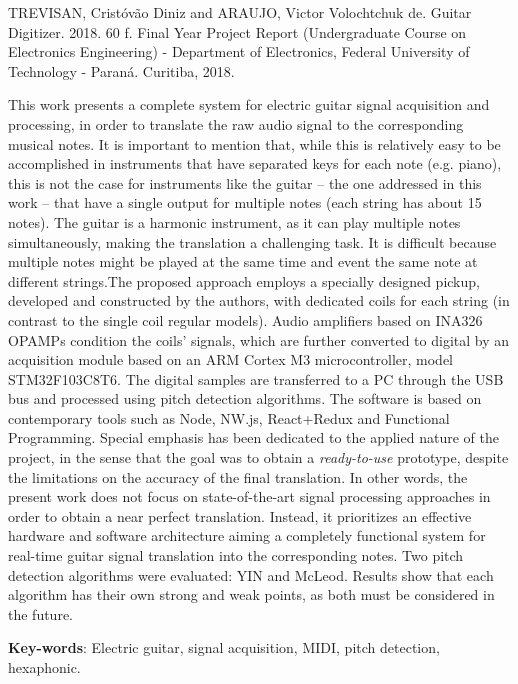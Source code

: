 \setlength{\absparsep}{18pt} %

\begin{summary}[Abstract]
	TREVISAN, Cristóvão Diniz and ARAUJO, Victor Volochtchuk de.
	Guitar Digitizer. 2018. 60 f. Final Year Project Report
	(Undergraduate Course on Electronics Engineering) - Department of Electronics,
	Federal University of Technology - Paraná. Curitiba, 2018.


	This work presents a complete system for electric guitar signal acquisition and processing, in order to translate
	the raw audio signal to the corresponding musical notes. It is important to mention that, while this is
	relatively easy to be accomplished in instruments that have separated keys for each note (e.g. piano),
	this is not the case for instruments like the guitar – the one addressed in this work – that have a single
	output for multiple notes (each string has about 15 notes). The guitar is a harmonic instrument, as it can
	play multiple notes simultaneously, making the translation a challenging task. It is difficult because
	multiple notes might be played at the same time and event the same note at different strings.The proposed
	approach employs a specially designed pickup, developed and constructed by the authors, with dedicated coils for
	each string (in contrast to the single coil regular models). Audio amplifiers based on INA326 OPAMPs
	condition the coils’ signals, which are further converted to digital by an acquisition module based on an
	ARM Cortex M3 microcontroller, model STM32F103C8T6. The digital samples are transferred to a PC
	through the USB bus and processed using pitch detection algorithms. The software is based on
	contemporary tools such as Node, NW.js, React+Redux and Functional Programming. Special emphasis
	has been dedicated to the applied nature of the project, in the sense that the goal was to obtain a
	\emph{ready-to-use} prototype, despite the limitations on the accuracy of the final translation. In other
	words, the present work does not focus on state-of-the-art signal processing approaches in order to
	obtain a near perfect translation. Instead, it prioritizes an effective hardware and software architecture
	aiming a completely functional system for real-time guitar signal translation into the corresponding
	notes. Two pitch detection algorithms were evaluated: YIN and McLeod. Results show that each algorithm
	has their own strong and weak points, as both must be considered in the future.


	\textbf{Key-words}: Electric guitar, signal acquisition, MIDI, pitch detection, hexaphonic.
\end{summary}

